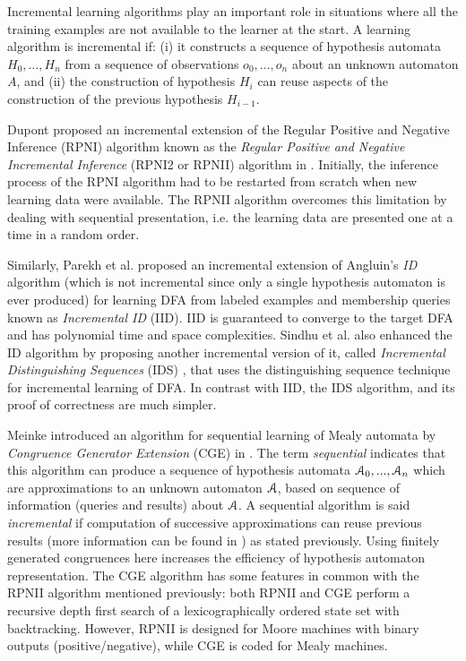 Incremental learning algorithms play an important role in
situations where all the training examples are not available to
the learner at the start. A learning algorithm is incremental if:
(i) it constructs a sequence of hypothesis automata $H_0, \dots,
H_n$ from a sequence of observations $o_0, \dots, o_n$  about an
unknown automaton $A$, and (ii) the construction of hypothesis
$H_i$ can reuse aspects of the construction of the previous
hypothesis $H_{i-1}$.

Dupont proposed an incremental extension of the Regular Positive
and Negative Inference (RPNI) algorithm known as the
\textit{Regular Positive and Negative Incremental Inference}
(RPNI2 or RPNII) algorithm in \cite{Dupont96incrementalregular}.
Initially, the inference process of the RPNI algorithm had to be
restarted from scratch when new learning data were available. The
RPNII algorithm overcomes this limitation by dealing with
sequential presentation, i.e. the learning data are presented one
at a time in a random order.

Similarly, Parekh et al. \cite{parekh98} proposed an incremental
extension of Angluin's \textit{ID} algorithm \cite{ANGLUIN198176}
(which is not incremental since only a single hypothesis
automaton is ever produced) for learning DFA from labeled
examples and membership queries known as \textit{Incremental ID}
(IID). IID is guaranteed to converge to the target DFA and has
polynomial time and space complexities. Sindhu et al. also
enhanced the ID algorithm by proposing another incremental
version of it, called \textit{Incremental Distinguishing
Sequences} (IDS) \cite{journals/corr/abs-1206-2691}, that uses
the distinguishing sequence technique for incremental learning of
DFA. In contrast with IID, the IDS algorithm, and its proof of
correctness are much simpler.

Meinke introduced an algorithm for sequential learning of Mealy
automata by \textit{Congruence Generator Extension} (CGE) in
\cite{meinkeCGE}. The term \textit{sequential} indicates that
this algorithm can produce a sequence of hypothesis automata
$\EuScript{A}_0, ..., \EuScript{A}_n$ which are approximations to
an unknown automaton $\EuScript{A}$, based on sequence of
information (queries and results) about $\EuScript{A}$. A
sequential algorithm is said \textit{incremental} if computation
of successive approximations can reuse previous results (more
information can be found in \cite{Parekh00grammarinference}) as
stated previously.  Using finitely generated congruences here
increases the efficiency of hypothesis automaton representation.
The CGE algorithm has some features in common with the RPNII
algorithm mentioned previously: both RPNII and CGE perform a
recursive depth first search of a lexicographically ordered state
set with backtracking. However, RPNII is designed for Moore
machines with binary outputs (positive/negative), while CGE is
coded for Mealy machines.


